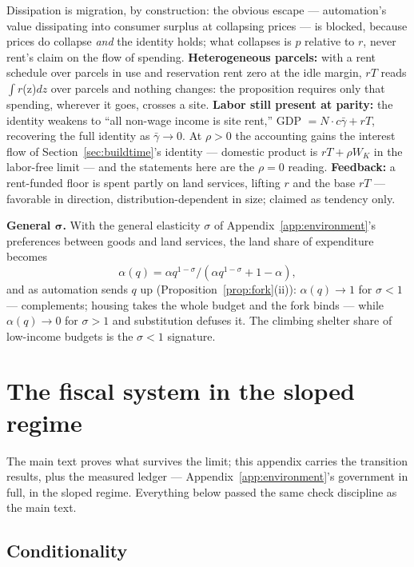 \documentclass[12pt]{article}
\theoremstyle{plain}
\begin{document}
Dissipation is migration, by construction: the obvious escape --- automation's value dissipating into consumer surplus at collapsing prices --- is blocked, because prices do collapse \emph{and} the identity holds; what collapses is $p$ relative to $r$, never rent's claim on the flow of spending. \textbf{Heterogeneous parcels:} with a rent schedule over parcels in use and reservation rent zero at the idle margin, $rT$ reads $\int r$(z)$dz$ over parcels and nothing changes: the proposition requires only that spending, wherever it goes, crosses a site. \textbf{Labor still present at parity:} the identity weakens to ``all non-wage income is site rent,'' GDP $= N\cdot c\bar{\gamma} + rT$, recovering the full identity as $\bar{\gamma} \to 0$. At $\rho > 0$ the accounting gains the interest flow of Section~\ref{sec:buildtime}'s identity --- domestic product is $rT + \rho W_K$ in the labor-free limit --- and the statements here are the $\rho = 0$ reading. \textbf{Feedback:} a rent-funded floor is spent partly on land services, lifting $r$ and the base $rT$ --- favorable in direction, distribution-dependent in size; claimed as tendency only.

\textbf{General $\bm{\sigma}$.} With the general elasticity $\sigma$ of Appendix~\ref{app:environment}'s preferences between goods and land services, the land share of expenditure becomes
\begin{equation}\label{eq:ces-share}
\alpha (q) = \alpha q^{1-\sigma} / (\alpha q^{1-\sigma} + 1 - \alpha ),
\end{equation}
and as automation sends $q$ up (Proposition~\ref{prop:fork}(ii)): $\alpha (q) \to 1$ for $\sigma < 1$ --- complements; housing takes the whole budget and the fork binds --- while $\alpha (q) \to 0$ for $\sigma > 1$ and substitution defuses it. The climbing shelter share of low-income budgets is the $\sigma < 1$ signature.

\section{The fiscal system in the sloped regime}\label{app:fiscal}

The main text proves what survives the limit; this appendix carries the transition results, plus the measured ledger --- Appendix~\ref{app:environment}'s government in full, in the sloped regime. Everything below passed the same check discipline as the main text.

\subsection{Conditionality}\label{app:conditionality}
\end{document}
